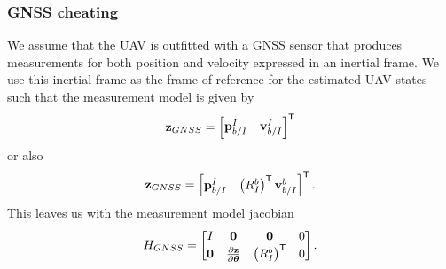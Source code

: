 \subsubsection{GNSS cheating}
We assume that the UAV is outfitted with a GNSS sensor that produces
measurements for both position and velocity expressed in an inertial frame. We
use this inertial frame as the frame of reference for the estimated UAV states
such that the measurement model is given by
\begin{equation}
  \boldsymbol{\mathrm{z}}_{GNSS} = 
  \begin{bmatrix}
    \boldsymbol{\mathrm{p}}_{b/I}^{I} & \boldsymbol{\mathrm{v}}_{b/I}^{I}
  \end{bmatrix}^{\mathsf{T}}
\end{equation}
or also
\begin{equation}
  \boldsymbol{\mathrm{z}}_{GNSS} = 
  \begin{bmatrix}
    \boldsymbol{\mathrm{p}}_{b/I}^{I} & \left(R_I^b\right)^{\mathsf{T}} \boldsymbol{\mathrm{v}}_{b/I}^{b}
  \end{bmatrix}^{\mathsf{T}}.
\end{equation}
This leaves us with the measurement model jacobian
\begin{equation}
  H_{GNSS} =
  \begin{bmatrix}
    I & \boldsymbol{\mathrm{0}} & \boldsymbol{\mathrm{0}} & 0 \\
    \boldsymbol{\mathrm{0}} & \frac{\partial \boldsymbol{\mathrm{z}}}{\partial \boldsymbol{\mathrm{\theta}}} & 
      \left(R_I^b\right)^{\mathsf{T}} & 0
  \end{bmatrix}.
\end{equation}

